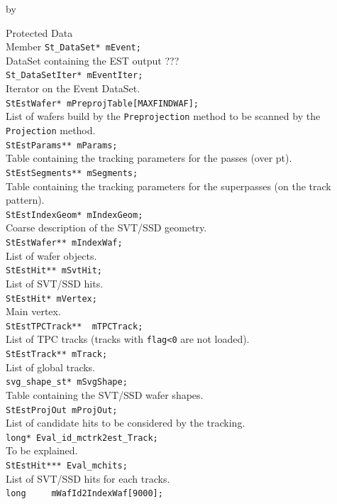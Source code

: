 \documentclass[twoside]{article}
\newcommand{\entrylabel}[1]{\mbox{\textbf{{#1}}}\hfil}%
\newenvironment{entry}
{\begin{list}{}%
    {\renewcommand{\makelabel}{\entrylabel}%
     \setlength{\labelwidth}{90pt}%
     \setlength{\leftmargin}{\labelwidth}
     \advance\leftmargin by \labelsep%
      }%
    }%
  {\end{list}}
\newcommand{\Entrylabel}[1]%
{\raisebox{0pt}[1ex][0pt]{\makebox[\labelwidth][l]%
    {\parbox[t]{\labelwidth}{\hspace{0pt}\textbf{{#1}}}}}}
\newenvironment{Entry}%
{\renewcommand{\entrylabel}{\Entrylabel}\begin{entry}}%
  {\end{entry}}
\begin{document}
\begin{Entry}
\item[Protected Data\\ Member]
	\verb+St_DataSet* mEvent;+\\
	DataSet containing the EST output ??? \\
	\verb+St_DataSetIter* mEventIter;+\\
	Iterator on the Event DataSet.\\
	\verb+StEstWafer* mPreprojTable[MAXFINDWAF];+\\
	List of wafers build by the \verb+Preprojection+ method to be scanned by the \verb+Projection+ method.\\
	\verb+StEstParams** mParams;+\\
	Table containing the tracking parameters for the passes (over pt).\\
	\verb+StEstSegments** mSegments;+\\
	Table containing the tracking parameters for the superpasses (on the track pattern).\\
	\verb+StEstIndexGeom* mIndexGeom;+\\
	Coarse description of the SVT/SSD geometry.\\
	\verb+StEstWafer** mIndexWaf;+\\
	List of wafer objects.\\
	\verb+StEstHit** mSvtHit;+\\
	List of SVT/SSD hits.\\
	\verb+StEstHit* mVertex;+\\
	Main vertex.\\
	\verb+StEstTPCTrack**  mTPCTrack;+\\  
	List of TPC tracks (tracks with \verb+flag<0+ are not loaded).\\
	\verb+StEstTrack** mTrack;+\\
	List of global tracks.\\
	\verb+svg_shape_st* mSvgShape;+\\
	Table containing the SVT/SSD wafer shapes.\\
	\verb+StEstProjOut mProjOut;+\\ 
	List of candidate hits to be considered by the tracking.\\
	\verb+long* Eval_id_mctrk2est_Track;+\\
	To be explained.\\
	\verb+StEstHit*** Eval_mchits;+\\
	List of SVT/SSD hits for each tracks.\\
	\verb+long     mWafId2IndexWaf[9000];+\\

\end{Entry}
\end{document}
